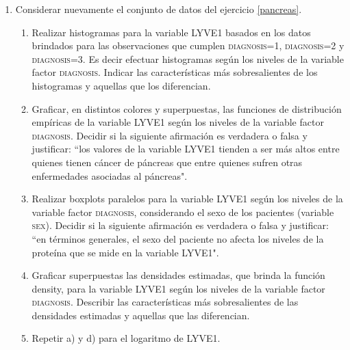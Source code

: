 \documentclass[12pt]{article}%
\begin{document}
\begin{enumerate}
\item Considerar nuevamente el conjunto de datos del ejercicio \ref{pancreas}. 
		\begin{enumerate}
			\item Realizar histogramas para la variable \textsc{LYVE1} basados en los datos brindados para las observaciones que cumplen \textsc{diagnosis}=1, \textsc{diagnosis}=2 y \textsc{diagnosis}=3. Es decir efectuar histogramas seg\'un los niveles de la variable factor \textsc{diagnosis}. Indicar las caracter\'isticas m\'as sobresalientes de los histogramas y aquellas que los diferencian.
			\item Graficar, en distintos colores y superpuestas, las funciones de distribuci\'on emp\'iricas de la variable \textsc{LYVE1} seg\'un los niveles de la variable factor \textsc{diagnosis}. Decidir si la siguiente afirmaci\'on es verdadera o falsa y justificar: ``los valores de la variable \textsc{LYVE1} tienden a ser m\'as altos entre quienes tienen c\'ancer de p\'ancreas que entre quienes sufren otras enfermedades asociadas al p\'ancreas".
			\item Realizar boxplots paralelos para la variable \textsc{LYVE1} seg\'un los niveles de la variable factor \textsc{diagnosis}, considerando el sexo de los pacientes (variable \textsc{sex}). Decidir si la siguiente afirmaci\'on es verdadera o falsa y justificar: ``en t\'erminos generales, el sexo del paciente no afecta los niveles de la prote\'ina que se mide en la variable \textsc{LYVE1}".
			\item Graficar superpuestas las densidades estimadas, que brinda la funci\'on \textsf{density}, para la variable \textsc{LYVE1} seg\'un los niveles de la variable factor \textsc{diagnosis}. Describir las caracter\'isticas m\'as sobresalientes de las densidades estimadas y aquellas que las diferencian.
			\item Repetir a) y d) para el logaritmo de \textsc{LYVE1}.
	\end{enumerate}
	

\end{enumerate}
\end{document}
